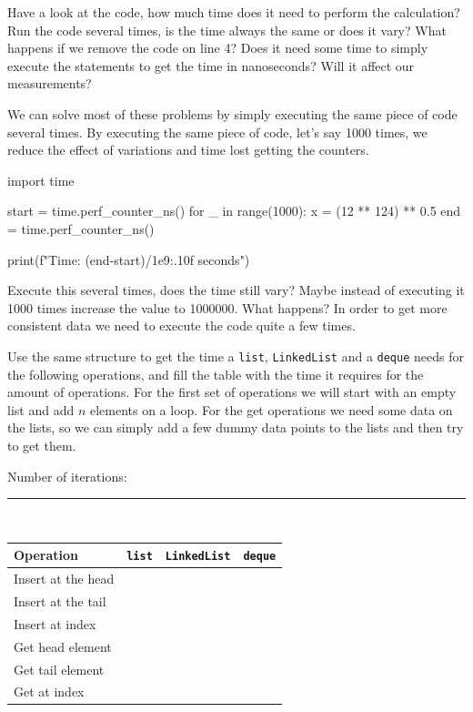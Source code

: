 \documentclass[10pt,a4paper]{article}
\begin{document}
Have a look at the code, how much time does it need to perform the calculation? Run the code several times, is the time always the same or does it vary? What happens if we remove the code on line 4? Does it need some time to simply execute the statements to get the time in nanoseconds? Will it affect our measurements?

We can solve most of these problems by simply executing the same piece of code several times. By executing the same piece of code, let's say 1000 times, we reduce the effect of variations and time lost getting the counters.

\begin{attachedlisting}[time]
import time

start = time.perf_counter_ns()
for _ in range(1000):
    x = (12 ** 124) ** 0.5
end = time.perf_counter_ns()

print(f"Time: {(end-start)/1e9:.10f} seconds")
\end{attachedlisting}

Execute this several times, does the time still vary? Maybe instead of executing it 1000 times increase the value to 1000000. What happens? In order to get more consistent data we need to execute the code quite a few times.

Use the same structure to get the time a \lstinline|list|, \lstinline|LinkedList| and a \lstinline|deque| needs for the following operations, and fill the table with the time it requires for the amount of operations. For the first set of operations we will start with an empty list and add $n$ elements on a loop. For the get operations we need some data on the lists, so we can simply add a few dummy data points to the lists and then try to get them.

\newpage
Number of iterations: \rule{3cm}{0.15mm}\\

\begin{table}[h!bt]
\renewcommand{\arraystretch}{1.4}
\centering
\begin{tabular}{m{}m{}m{}m{}}
\toprule
Operation & \lstinline|list| & \lstinline|LinkedList| & \lstinline|deque| \\
\midrule
Insert at the head & & &\\
Insert at the tail & & &\\
Insert at index & & &\\
\midrule
Get head element & & &\\
Get tail element & & &\\
Get at index & & &\\
\bottomrule
\end{tabular}
\end{table}
\end{document}
